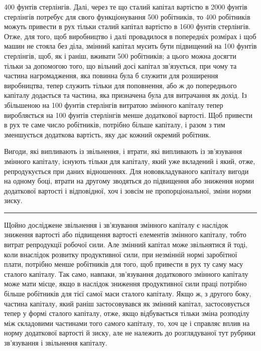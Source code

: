 \parcont{}  %
400 фунтів стерлінгів. Далі, через те що сталий капітал вартістю в 2000 фунтів стерлінгів потребує
для свого функціонування 500 робітників, то 400 робітників можуть привести в рух тільки сталий
капітал вартістю в 1600 фунтів стерлінгів. Отже,
для того, щоб виробництво і далі провадилося в попередніх
розмірах і щоб  машин не стояла без діла, змінний капітал
мусить бути підвищений на 100 фунтів стерлінгів, щоб, як і раніш, вживати 500 робітників; а цього
можна досягти тільки за
допомогою того, що вільний досі капітал зв’язується, при чому
та частина нагромадження, яка повинна була б служити для розширення виробництва, тепер служить
тільки для поповнення, або ж
до попереднього капіталу додається та частина, яка призначена
була для витрачання як дохід. Із збільшеною на 100 фунтів
стерлінгів витратою змінного капіталу тепер виробляється на
100 фунтів стерлінгів менше додаткової вартості. Щоб привести
в рух те саме число робітників, потрібно більше капіталу, і разом
з тим зменшується додаткова вартість, яку дає кожний окремий робітник.

Вигоди, які випливають із звільнення, і втрати, які випливають із зв’язування змінного капіталу,
існують тільки для капіталу, який уже вкладений і який, отже, репродукується при даних відношеннях.
Для нововкладуваного капіталу вигоди на
одному боці, втрати на другому зводяться до підвищення або
зниження норми додаткової вартості і відповідної, хоч і зовсім
не пропорціональної, зміни норми зиску.

\pfbreak

Щойно досліджене звільнення і зв’язування змінного капіталу є наслідок зниження вартості або
підвищення вартості
елементів змінного капіталу, тобто витрат репродукції робочої
сили. Але змінний капітал може звільнятися й тоді, коли внаслідок розвитку продуктивної сили, при
незмінній нормі заробітної плати, потрібно менше робітників для того, щоб привести
в рух ту саму масу сталого капіталу. Так само, навпаки, зв’язування додаткового змінного капіталу
може мати місце, якщо
в наслідок зниження продуктивної сили праці потрібно більше
робітників для тієї самої маси сталого капіталу. Якщо ж, з другого боку, частина капіталу, який
раніш застосовувався як змінний капітал, застосовується тепер у формі сталого капіталу, отже, якщо
відбувається тільки зміна розподілу між складовими
частинами того самого капіталу, то, хоч це і справляє вплив
на норму додаткової вартості й зиску, але не належить до розглядуваної тут рубрики зв’язування і
звільнення капіталу.

